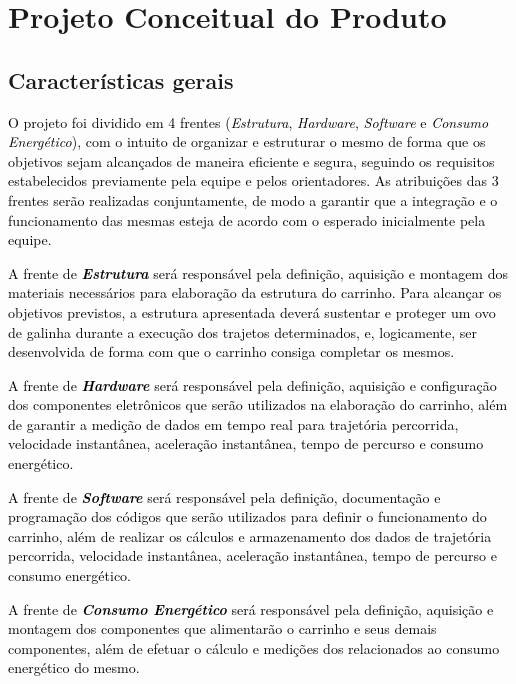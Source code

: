 \chapter{Projeto Conceitual do Produto}

\section{Características gerais}

\textcolor{black}{O projeto foi dividido em 4 frentes (\textit{Estrutura}, \textit{Hardware}, \textit{Software} e \textit{Consumo Energético}), com o intuito de organizar e estruturar o mesmo de forma que os objetivos sejam alcançados de maneira eficiente e segura, seguindo os requisitos estabelecidos previamente pela equipe e pelos orientadores.
As atribuições das 3 frentes serão realizadas conjuntamente, de modo a garantir que a integração e o funcionamento das mesmas esteja de acordo com o esperado inicialmente pela equipe.}

\textcolor{black}{A frente de \textbf{\textit{Estrutura}} será responsável pela definição, aquisição e montagem dos materiais necessários para elaboração da estrutura do carrinho. Para alcançar os objetivos previstos, a estrutura apresentada deverá sustentar e proteger um ovo de galinha durante a execução dos trajetos determinados, e, logicamente, ser desenvolvida de forma com que o carrinho consiga completar os mesmos. }

\textcolor{black}{A frente de \textbf{\textit{Hardware}} será responsável pela definição, aquisição e configuração dos componentes eletrônicos que serão utilizados na elaboração do carrinho, além de garantir a medição de dados em tempo real para trajetória percorrida, velocidade instantânea, aceleração instantânea, tempo de percurso e consumo energético.}

\textcolor{black}{A frente de \textbf{\textit{Software}} será responsável pela definição, documentação e programação dos códigos que serão utilizados para definir o funcionamento do carrinho, além de realizar os cálculos e armazenamento dos dados de trajetória percorrida, velocidade instantânea, aceleração instantânea, tempo de percurso e consumo energético.}



\textcolor{black}{A frente de \textbf{\textit{Consumo Energético}}  será responsável pela definição, aquisição e montagem dos componentes que alimentarão o carrinho e seus demais componentes, além de efetuar o cálculo e medições dos relacionados ao consumo energético do mesmo.}

